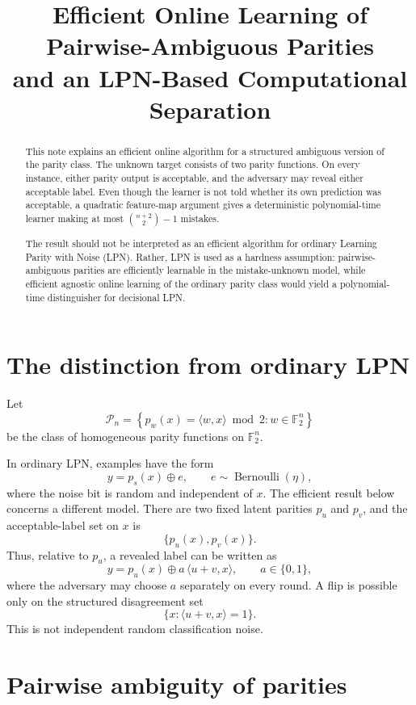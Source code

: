 \documentclass[11pt]{article}
\title{Efficient Online Learning of Pairwise-Ambiguous Parities\\
\large and an LPN-Based Computational Separation}
\author{}
\date{}
\theoremstyle{definition}
\theoremstyle{remark}
\newcommand{\F}{\mathbb{F}_2}
\newcommand{\Pn}{\mathcal{P}_n}
\newcommand{\ip}[2]{\langle #1,#2\rangle}
\begin{document}
\maketitle

\begin{abstract}
This note explains an efficient online algorithm for a structured ambiguous
version of the parity class.  The unknown target consists of two parity
functions.  On every instance, either parity output is acceptable, and the
adversary may reveal either acceptable label.  Even though the learner is not
told whether its own prediction was acceptable, a quadratic feature-map
argument gives a deterministic polynomial-time learner making at most
$\binom{n+2}{2}-1$ mistakes.

The result should not be interpreted as an efficient algorithm for ordinary
Learning Parity with Noise (LPN).  Rather, LPN is used as a hardness
assumption: pairwise-ambiguous parities are efficiently learnable in the
mistake-unknown model, while efficient agnostic online learning of the
ordinary parity class would yield a polynomial-time distinguisher for
decisional LPN.
\end{abstract}

\section{The distinction from ordinary LPN}

Let
\[
\Pn
=
\left\{
  p_w(x)=\ip{w}{x}\bmod 2 : w\in\F^n
\right\}
\]
be the class of homogeneous parity functions on $\F^n$.

In ordinary LPN, examples have the form
\[
  y=p_s(x)\oplus e,
  \qquad
  e\sim\operatorname{Bernoulli}(\eta),
\]
where the noise bit is random and independent of $x$.  The efficient result
below concerns a different model.  There are two fixed latent parities
$p_u$ and $p_v$, and the acceptable-label set on $x$ is
\[
  \{p_u(x),p_v(x)\}.
\]
Thus, relative to $p_u$, a revealed label can be written as
\[
  y=p_u(x)\oplus a\,\ip{u+v}{x},
  \qquad a\in\{0,1\},
\]
where the adversary may choose $a$ separately on every round.  A flip is
possible only on the structured disagreement set
\[
  \{x:\ip{u+v}{x}=1\}.
\]
This is not independent random classification noise.

\section{Pairwise ambiguity of parities}
\end{document}
